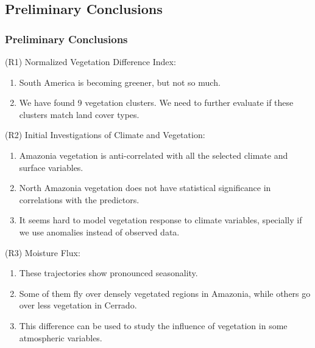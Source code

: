 \documentclass[11pt]{beamer}
\begin{document}
\subsection{Preliminary Conclusions}

\begin{frame}
  \frametitle{\normalsize{\textbf{
        Preliminary Conclusions
  }}}

  \scriptsize{
    
    \textbullet \: (R1) Normalized Vegetation Difference Index:

    \begin{enumerate}
      
    \item South America is becoming greener, but not so much.
      
    \item We have found 9 vegetation clusters. We need to further evaluate if
      these clusters match land cover types.
      
    \end{enumerate}
      
    \textbullet \: (R2) Initial Investigations of Climate and Vegetation:

    \begin{enumerate}

    \item Amazonia vegetation is anti-correlated with all the selected climate
      and surface variables.
      
    \item North Amazonia vegetation does not have statistical significance in
      correlations with the predictors.

    \item It seems hard to model vegetation response to climate variables,
      specially if we use anomalies instead of observed data.
      
    \end{enumerate}
    
    \textbullet \: (R3) Moisture Flux:

    \begin{enumerate}

    \item These trajectories show pronounced seasonality.
    
    \item Some of them fly over densely vegetated regions in Amazonia,
    while others go over less vegetation in Cerrado. 

    \item This difference can be used to study the influence of
    vegetation in some atmospheric variables.
      
    \end{enumerate}
  }
  
\end{frame}
\end{document}
